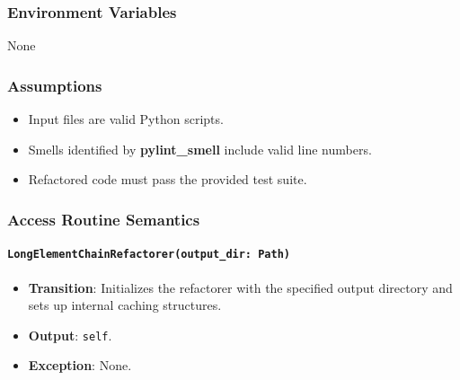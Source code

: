 \documentclass[12pt, titlepage]{article}
\begin{document}
\subsubsection{Environment Variables}
None

\subsubsection{Assumptions}

\begin{itemize}
\item Input files are valid Python scripts.
\item Smells identified by \textbf{pylint\_smell} include valid line numbers.
\item Refactored code must pass the provided test suite.
\end{itemize}

\subsubsection{Access Routine Semantics}

\paragraph{\texttt{LongElementChainRefactorer(output\_dir: Path)}}
\begin{itemize}
\item \textbf{Transition}: Initializes the refactorer with the specified output directory and sets up internal caching structures.
\item \textbf{Output}: \texttt{self}.
\item \textbf{Exception}: None.
\end{itemize}
\end{document}
